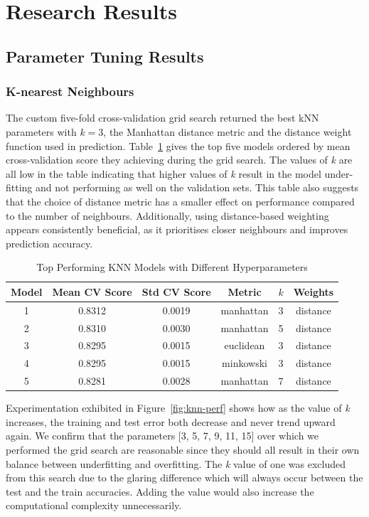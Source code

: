 \documentclass[10pt, conference]{IEEEtran}
\begin{document}
\section{Research Results}
\subsection{Parameter Tuning Results}
\subsubsection{K-nearest Neighbours}
The custom five-fold cross-validation grid search returned the best kNN parameters with $k=3$, the Manhattan distance metric and the distance weight function used in prediction. Table~\ref{tab:knn_comparison} gives the top five models ordered by mean cross-validation score they achieving during the grid search. The values of \textit{k} are all low in the table indicating that higher values of \textit{k} result in the model under-fitting and not performing as well on the validation sets. This table also suggests that the choice of distance metric has a smaller effect on performance compared to the number of neighbours. Additionally, using distance-based weighting appears consistently beneficial, as it prioritises closer neighbours and improves prediction accuracy.

\begin{table}[htbp]
	\caption{Top Performing KNN Models with Different Hyperparameters}
	\centering
	\begin{tabular}{|c|c|c|c|c|c|}
		\hline
		\textbf{Model} & \textbf{Mean CV Score} & \textbf{Std CV Score} & \textbf{Metric} & \textbf{$k$} & \textbf{Weights} \\ \hline
		1 & 0.8312 & 0.0019 & manhattan & 3 & distance \\ \hline
		2 & 0.8310 & 0.0030 & manhattan & 5 & distance \\ \hline
		3 & 0.8295 & 0.0015 & euclidean & 3 & distance \\ \hline
		4 & 0.8295 & 0.0015 & minkowski & 3 & distance \\ \hline
		5 & 0.8281 & 0.0028 & manhattan & 7 & distance \\ \hline
	\end{tabular}
	\label{tab:knn_comparison}
\end{table}


Experimentation exhibited in Figure~\ref{fig:knn-perf} shows how as the value of \textit{k} increases, the training and test error both decrease and never trend upward again. We confirm that the parameters [3, 5, 7, 9, 11, 15] over which we performed the grid search are reasonable since they should all result in their own balance between underfitting and overfitting. The \textit{k} value of one was excluded from this search due to the glaring difference which will always occur between the test and the train accuracies. Adding the value would also increase the computational complexity unnecessarily.
\end{document}
